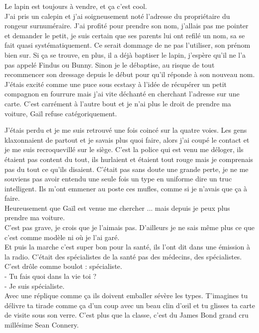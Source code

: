 Le lapin est toujours à vendre, et ça c'est cool. \\
J'ai pris un calepin et j'ai soigneusement noté l'adresse du propriétaire du rongeur surnuméraire. J'ai profité pour prendre son nom, j'allais pas me pointer et demander le petit, je suis certain que ses parents lui ont refilé un nom, sa se fait quasi systématiquement. Ce serait dommage de ne pas l'utiliser, son prénom bien sur. Si ça se trouve, en plus, il a déjà baptiser le lapin, j'espère qu'il ne l'a pas appelé Findus ou Bunny. Sinon je le débaptise, au risque de tout recommencer son dressage depuis le début pour qu'il réponde à son nouveau nom. \\

J'étais excité comme une puce sous ecstasy à l'idée de récupérer un petit compagnon en fourrure mais j'ai vite déchanté en cherchant l'adresse sur une carte. C'est carrément à l'autre bout et je n'ai plus le droit de prendre ma voiture, Gaïl refuse catégoriquement.

J'étais perdu et je me suis retrouvé une fois coincé sur la quatre voies. Les gens klaxonnaient de partout et je savais plus quoi faire, alors j'ai coupé le contact et je me suis recroquevillé sur le siège. C'est la police qui est venu me déloger, ils étaient pas content du tout, ils hurlaient et étaient tout rouge mais je comprenais pas du tout ce qu'ils disaient. C'était pas sans doute une grande perte, je ne me souviens pas avoir entendu une seule fois un type en uniforme dire un truc intelligent. Ils m'ont emmener au poste ces mufles, comme si je n'avais que ça à faire. \\
Heureusement que Gaïl est venue me chercher ... mais depuis je peux plus prendre ma voiture. \\

C'est pas grave, je crois que je l'aimais pas. D’ailleurs je ne sais même plus ce que c'est comme modèle ni où je l'ai garé.\\

Et puis la marche c'est super bon pour la santé, ils l'ont dit dans une émission à la radio. C'était des spécialistes de la santé pas des médecins, des spécialistes. C'est drôle comme boulot : spécialiste. \\

- Tu fais quoi dans la vie toi ? \\
- Je suis spécialiste. \\

Avec une réplique comme ça ils doivent emballer sévère les types. T'imagines tu délivre ta tirade comme ça d'un coup avec un beau clin d’œil et tu glisses ta carte de visite sous son verre. C'est plus que la classe, c'est du James Bond grand cru millésime Sean Connery.\\

